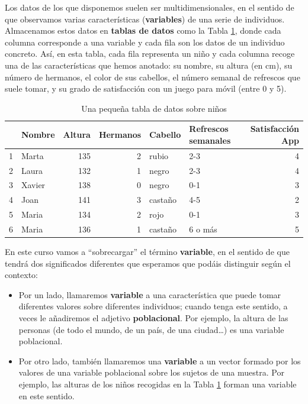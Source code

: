 \documentclass[
]{book}
\theoremstyle{definition}
\theoremstyle{definition}
\theoremstyle{definition}
\theoremstyle{definition}
\theoremstyle{remark}
\begin{document}
Los datos de los que disponemos suelen ser multidimensionales, en el sentido de que observamos varias características (\textbf{variables}) de una serie de individuos.
Almacenamos estos datos en \textbf{tablas de datos} como la Tabla \ref{tab:tabla1}, donde cada columna corresponde a una variable y cada fila son los datos de un individuo concreto. Así, en esta tabla, cada fila representa un niño y cada columna recoge una de las características que hemos anotado: su nombre, su altura (en cm), su número de hermanos, el color de sus cabellos, el número semanal de refrescos que suele tomar, y su grado de satisfacción con un juego para móvil (entre 0 y 5).

\begin{table}

\caption{\label{tab:tabla1}Una pequeña tabla de datos sobre niños}
\centering
\begin{tabular}[t]{l|l|r|r|l|l|r}
\hline
  & Nombre & Altura & Hermanos & Cabello & Refrescos semanales & Satisfacción App\\
\hline
1 & Marta & 135 & 2 & rubio & 2-3 & 4\\
\hline
2 & Laura & 132 & 1 & negro & 2-3 & 4\\
\hline
3 & Xavier & 138 & 0 & negro & 0-1 & 3\\
\hline
4 & Joan & 141 & 3 & castaño & 4-5 & 2\\
\hline
5 & Maria & 134 & 2 & rojo & 0-1 & 3\\
\hline
6 & Maria & 136 & 1 & castaño & 6 o más & 5\\
\hline
\end{tabular}
\end{table}

\begin{rmdcaution}
En este curso vamos a ``sobrecargar'' el término \textbf{variable}, en el sentido de que tendrá dos significados diferentes que esperamos que podáis distinguir según el contexto:

\begin{itemize}
\item
  Por un lado, llamaremos \textbf{variable} a una característica que puede tomar diferentes valores sobre diferentes individuos; cuando tenga este sentido, a veces le añadiremos el adjetivo \textbf{poblacional}. Por ejemplo, la altura de las personas (de todo el mundo, de un país, de una ciudad\ldots) es una variable poblacional.
\item
  Por otro lado, también llamaremos una \textbf{variable} a un vector formado por los valores de una variable poblacional sobre los sujetos de una muestra. Por ejemplo, las alturas de los niños recogidas en la Tabla \ref{tab:tabla1} forman una variable en este sentido.
\end{itemize}
\end{rmdcaution}
\end{document}
